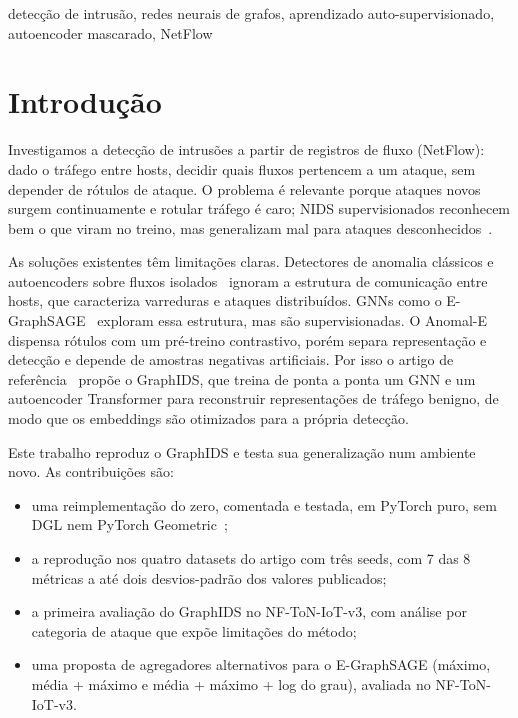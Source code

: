 \documentclass[conference]{IEEEtran}
\begin{document}
\begin{IEEEkeywords}
detecção de intrusão, redes neurais de grafos, aprendizado auto-supervisionado,
autoencoder mascarado, NetFlow
\end{IEEEkeywords}

\IEEEpeerreviewmaketitle

\section{Introdução}

Investigamos a detecção de intrusões a partir de registros de fluxo (NetFlow):
dado o tráfego entre hosts, decidir quais fluxos pertencem a um ataque, sem
depender de rótulos de ataque. O problema é relevante porque ataques novos surgem
continuamente e rotular tráfego é caro; NIDS supervisionados reconhecem bem o que
viram no treino, mas generalizam mal para ataques
desconhecidos~\cite{sommer2010outside,maseer2021benchmarking}.

As soluções existentes têm limitações claras. Detectores de anomalia clássicos e
autoencoders sobre fluxos isolados~\cite{he2003cblof,liu2008iforest,mirsky2018kitsune}
ignoram a estrutura de comunicação entre hosts, que caracteriza varreduras e
ataques distribuídos. GNNs como o E-GraphSAGE~\cite{lo2022egraphsage} exploram
essa estrutura, mas são supervisionadas. O Anomal-E~\cite{caville2022anomale}
dispensa rótulos com um pré-treino contrastivo, porém separa representação e
detecção e depende de amostras negativas artificiais. Por isso o artigo de
referência~\cite{guerra2025graphids} propõe o GraphIDS, que treina de ponta a
ponta um GNN e um autoencoder Transformer para reconstruir representações de
tráfego benigno, de modo que os embeddings são otimizados para a própria
detecção.

Este trabalho reproduz o GraphIDS e testa sua generalização num ambiente novo.
As contribuições são:
\begin{itemize}
  \item uma reimplementação do zero, comentada e testada, em PyTorch puro, sem
        DGL nem PyTorch Geometric~\cite{equipe10_repo};
  \item a reprodução nos quatro datasets do artigo com três seeds, com 7 das 8
        métricas a até dois desvios-padrão dos valores publicados;
  \item a primeira avaliação do GraphIDS no NF-ToN-IoT-v3, com análise por
        categoria de ataque que expõe limitações do método;
  \item uma proposta de agregadores alternativos para o E-GraphSAGE (máximo,
        média + máximo e média + máximo + log do grau), avaliada no
        NF-ToN-IoT-v3.
\end{itemize}
\end{document}
